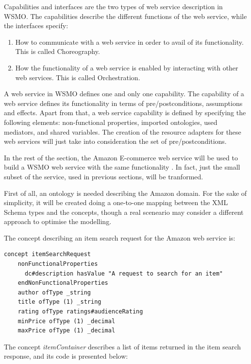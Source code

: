\documentclass{fast_latex}
\begin{document}
Capabilities and interfaces are the two types of web service description in WSMO. The capabilities describe the different functions of the web service, while the interfaces specify:
\begin{enumerate}
	\item How to communicate with a web service in order to avail of its functionality. This is called Choreography.
	\item How the functionality of a web service is enabled by interacting with other web services. This is called Orchestration.
\end{enumerate}

A web service in WSMO defines one and only one capability. The capability of a web service defines its functionality in terms of pre/postconditions, assumptions and effects. Apart from that, a web service capability is defined by specifying the following elements: non-functional properties, imported ontologies, used mediators, and shared variables. The creation of the resource adapters for these web services will just take into consideration the set of pre/postconditions.

In the rest of the section, the Amazon E-commerce web service will be used to build a WSMO web service with the same functionality \cite{wsmo_amazon}. In fact, just the small subset of the service, used in previous sections, will be tranformed.

First of all, an ontology is needed describing the Amazon domain. For the sake of simplicity, it will be created doing a one-to-one mapping between the XML Schema types and the concepts, though a real sceneario may consider a different approach to optimise the modelling.

The concept describing an item search request for the Amazon web service is:

\singlespacing
\begin{small}
\begin{verbatim}
concept itemSearchRequest
    nonFunctionalProperties
      dc#description hasValue "A request to search for an item"
    endNonFunctionalProperties
    author ofType _string
    title ofType (1) _string
    rating ofType ratings#audienceRating
    minPrice ofType (1) _decimal
    maxPrice ofType (1) _decimal
\end{verbatim}
\end{small}
\doublespacing

The concept \emph{itemContainer} describes a list of items returned in the item search response, and its code is presented below:
\end{document}
